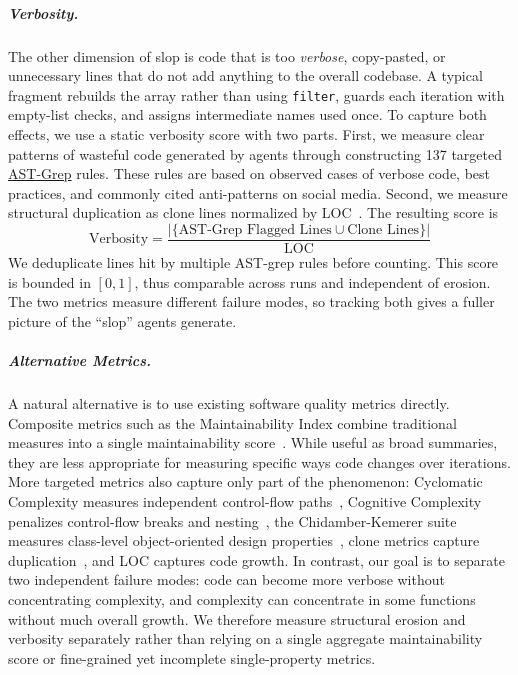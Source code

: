 \subparagraph{Verbosity.} The other dimension of slop is code that is too \emph{verbose}, copy-pasted, or unnecessary lines that do not add anything to the overall codebase. A typical \codesearch{} fragment rebuilds the array rather than using \texttt{filter}, guards each iteration with empty-list checks, and assigns intermediate names used once. To capture both effects, we use a static verbosity score with two parts. First, we measure clear patterns of wasteful code generated by agents through constructing 137 targeted \href{https://ast-grep.github.io}{AST-Grep} rules. These rules are based on observed cases of verbose code, best practices, and commonly cited anti-patterns on social media. Second, we measure structural duplication as clone lines normalized by LOC~\citep{juergens2009code,Alam2023GPTCloneBenchA}. The resulting score is
\begin{equation}
\label{eq:verbosity}
\text{Verbosity}
= \frac{|\{\text{AST-Grep Flagged Lines} \cup \text{Clone Lines}\}|}{\text{LOC}}
\end{equation}
We deduplicate lines hit by multiple AST-grep rules before counting. This score is bounded in $[0,1]$, thus comparable across runs and independent of erosion. The two metrics measure different failure modes, so tracking both gives a fuller picture of the ``slop'' agents generate.

\subparagraph{Alternative Metrics.}  A natural alternative is to use existing software quality metrics directly. Composite metrics such as the Maintainability Index combine traditional measures into a single maintainability score~\citep{oman1992maintainability}. While useful as broad summaries, they are less appropriate for measuring specific ways code changes over iterations. More targeted metrics also capture only part of the phenomenon: Cyclomatic Complexity measures independent control-flow paths~\citep{mccabe1976-complexity}, Cognitive Complexity penalizes control-flow breaks and nesting~\citep{campbell2018cognitive}, the Chidamber-Kemerer suite measures class-level object-oriented design properties~\citep{chidamber1994metrics}, clone metrics capture duplication~\citep{juergens2009code,Alam2023GPTCloneBenchA}, and LOC captures code growth. In contrast, our goal is to separate two independent failure modes: code can become more verbose without concentrating complexity, and complexity can concentrate in some functions without much overall growth. We therefore measure structural erosion and verbosity separately rather than relying on a single aggregate maintainability score or fine-grained yet incomplete single-property metrics.

